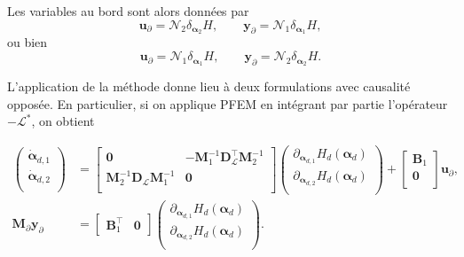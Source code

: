 Les variables au bord sont alors données par
\begin{equation*}
\bm{u}_\partial = \mathcal{N}_2 \displaystyle \delta_{\bm{\alpha}_2}H, \qquad  \bm{y}_\partial = \mathcal{N}_1 \displaystyle \delta_{\bm{\alpha}_1}H, 
\end{equation*}
ou bien
\begin{equation*}
\bm{u}_\partial = \mathcal{N}_1 \displaystyle \delta_{\bm{\alpha}_1}H, \qquad 
\bm{y}_\partial = \mathcal{N}_2 \displaystyle \delta_{\bm{\alpha}_2}H.
\end{equation*}

L'application de la méthode donne lieu à deux formulations avec causalité opposée. En particulier, si on applique PFEM en intégrant par partie l'opérateur $-\mathcal{L}^*$, on obtient

\begin{equation*}
\begin{aligned}
\begin{pmatrix}
\dot{\bm{\alpha}}_{d, 1} \\
\dot{\bm{\alpha}}_{d, 2} \\
\end{pmatrix}
&= \begin{bmatrix}
\mathbf{0} & - \mathbf{M}_1^{-1} \mathbf{D}_{\mathcal{L}}^\top \mathbf{M}_2^{-1}\\
\mathbf{M}_2^{-1} \mathbf{D}_{\mathcal{L}} \mathbf{M}_1^{-1} & \mathbf{0} \\
\end{bmatrix} 
\begin{pmatrix}
\partial_{\bm{\alpha}_{d, 1}} H_d(\bm{\alpha}_d)\\
\partial_{\bm{\alpha}_{d, 2}} H_d(\bm{\alpha}_d)\\
\end{pmatrix} + 
\begin{bmatrix}
\mathbf{B}_1\\
\mathbf{0}\\
\end{bmatrix}
\mathbf{u}_\partial,  \\
\mathbf{M}_\partial {\mathbf{y}_\partial} &= \begin{bmatrix}
\mathbf{B}_1^\top & \mathbf{0}
\end{bmatrix}\begin{pmatrix}
\partial_{\bm{\alpha}_{d, 1}} H_d(\bm{\alpha}_d)\\
\partial_{\bm{\alpha}_{d, 2}} H_d(\bm{\alpha}_d)\\
\end{pmatrix}.
\end{aligned}
\end{equation*}

